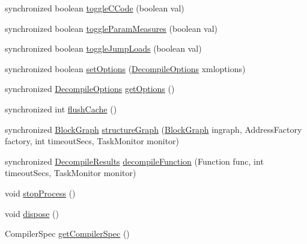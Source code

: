 \begin{DoxyCompactItemize}
\item 
synchronized boolean \mbox{\hyperlink{classghidra_1_1app_1_1decompiler_1_1_decomp_interface_ad43588ca711cada0fbc8421ebff714f5}{toggle\+C\+Code}} (boolean val)
\item 
synchronized boolean \mbox{\hyperlink{classghidra_1_1app_1_1decompiler_1_1_decomp_interface_abb67168acc7272f70feac50007c29223}{toggle\+Param\+Measures}} (boolean val)
\item 
synchronized boolean \mbox{\hyperlink{classghidra_1_1app_1_1decompiler_1_1_decomp_interface_ae85bc75b791bef3138569cad3de61164}{toggle\+Jump\+Loads}} (boolean val)
\item 
synchronized boolean \mbox{\hyperlink{classghidra_1_1app_1_1decompiler_1_1_decomp_interface_a1c6be053337ad093e441a722c1b157b9}{set\+Options}} (\mbox{\hyperlink{classghidra_1_1app_1_1decompiler_1_1_decompile_options}{Decompile\+Options}} xmloptions)
\item 
synchronized \mbox{\hyperlink{classghidra_1_1app_1_1decompiler_1_1_decompile_options}{Decompile\+Options}} \mbox{\hyperlink{classghidra_1_1app_1_1decompiler_1_1_decomp_interface_a4a49d6b06c33e71fb1d336703d6b49cb}{get\+Options}} ()
\item 
synchronized int \mbox{\hyperlink{classghidra_1_1app_1_1decompiler_1_1_decomp_interface_abc7f4380b716927ca1199f41af1307c9}{flush\+Cache}} ()
\item 
synchronized \mbox{\hyperlink{class_block_graph}{Block\+Graph}} \mbox{\hyperlink{classghidra_1_1app_1_1decompiler_1_1_decomp_interface_a5cd68852b39b8dc136790b8741ee029d}{structure\+Graph}} (\mbox{\hyperlink{class_block_graph}{Block\+Graph}} ingraph, Address\+Factory factory, int timeout\+Secs, Task\+Monitor monitor)
\item 
synchronized \mbox{\hyperlink{classghidra_1_1app_1_1decompiler_1_1_decompile_results}{Decompile\+Results}} \mbox{\hyperlink{classghidra_1_1app_1_1decompiler_1_1_decomp_interface_afcd859e79e0529d90edaf9ec0731adb6}{decompile\+Function}} (Function func, int timeout\+Secs, Task\+Monitor monitor)
\item 
void \mbox{\hyperlink{classghidra_1_1app_1_1decompiler_1_1_decomp_interface_a9c46f9ab1edab88fecfb1ff9faa2d1df}{stop\+Process}} ()
\item 
void \mbox{\hyperlink{classghidra_1_1app_1_1decompiler_1_1_decomp_interface_a627a3e6485e083dfbb41ffa25b131ad4}{dispose}} ()
\item 
Compiler\+Spec \mbox{\hyperlink{classghidra_1_1app_1_1decompiler_1_1_decomp_interface_ab7b5650e01b82f6c1c6f3cf23d3e758a}{get\+Compiler\+Spec}} ()
\end{DoxyCompactItemize}
